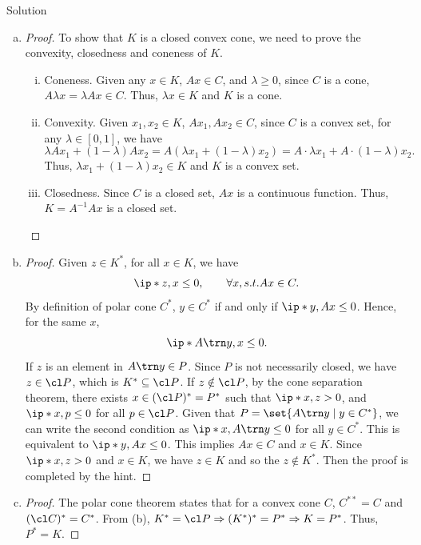 \documentclass{article}
\theoremstyle{plain}
\theoremstyle{definition}
\theoremstyle{remark}
\begin{document}
\begin{solution}
    {Solution}
    \begin{enumerate}[(a)]
        \item {
            \begin{proof}
                To show that $K$ is a closed convex cone, we need to prove the convexity, closedness and coneness of $K$.
                \begin{enumerate}[(i)]
                    \item Coneness. Given any $x\in K$, $Ax\in C$, and $\lambda\geq0$, since $C$ is a cone, $A\lambda x=\lambda Ax\in C$. Thus, $\lambda x\in K$ and $K$ is a cone.
                    \item Convexity. Given $x_1, x_2 \in K$, $Ax_1, Ax_2 \in C$, since $C$ is a convex set, for any $\lambda\in[0, 1]$, we have \[\lambda Ax_1+(1-\lambda)Ax_2=A(\lambda x_1+(1-\lambda)x_2)=A\cdot\lambda x_1+A\cdot(1-\lambda)x_2.\] Thus, $\lambda x_1+(1-\lambda)x_2\in K$ and $K$ is a convex set.
                    \item Closedness. Since $C$ is a closed set, $Ax$ is a continuous function. Thus, $K=A^{-1}Ax$ is a closed set.
                \end{enumerate}
            \end{proof}
        }
        \item {
            \begin{proof}
                Given $z\in K^*$, for all $x\in K$, we have \[\ip*{z,x}\leq 0, \qquad \forall x, s.t. Ax\in C.\] By definition of polar cone $C^*$, $y\in C^*$ if and only if $\ip*{y, Ax}\leq 0$. Hence, for the same $x$, \[\ip*{A\trn y, x}\leq 0.\] If $z$ is an element in $A\trn y\in P$. Since $P$ is not necessarily closed, we have $z\in \cl P$, which is $K^*\subseteq \cl P$. If $z\notin \cl P$, by the cone separation theorem, there exists $x\in (\cl P)^*=P^*$ such that $\ip*{x, z}>0$, and $\ip*{x, p}\leq 0$ for all $p\in \cl P$. Given that $P=\set{A\trn y \mid y\in C^*}$, we can write the second condition as $\ip*{x, A\trn y} \leq 0$ for all $y\in C^*$. This is equivalent to $\ip*{y, Ax}\leq 0$. This implies $Ax\in C$ and $x\in K$. Since $\ip*{x, z}>0$ and $x\in K$, we have $z\in K$ and so the $z\notin K^*$. Then the proof is completed by the hint.
            \end{proof}
        }
        \item {
            \begin{proof}
                The polar cone theorem states that for a convex cone $C$, $C^{**}=C$ and $(\cl C)^*=C^*$. From (b), $K^*=\cl P\Rightarrow (K^*)^*=P^*\Rightarrow K=P^*$. Thus, $P^*=K$.
            \end{proof}
        }
    \end{enumerate}
\end{solution}
\end{document}
